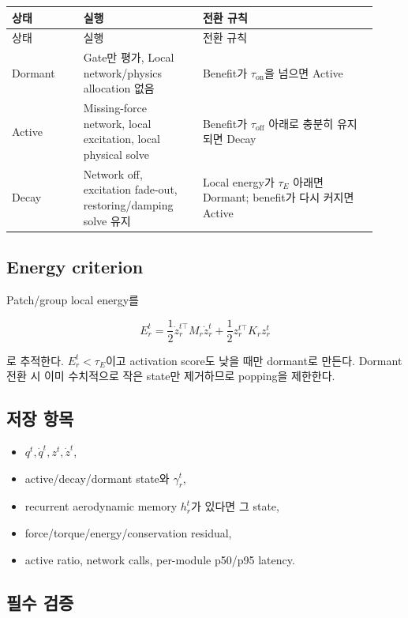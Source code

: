 \documentclass[11pt,a4paper]{article}
\begin{document}
\begin{longtable}{L{0.18\linewidth}L{0.30\linewidth}L{0.44\linewidth}}
\toprule
상태 & 실행 & 전환 규칙 \\
\midrule
\endfirsthead
\toprule
상태 & 실행 & 전환 규칙 \\
\midrule
\endhead
Dormant & Gate만 평가, Local network/physics allocation 없음 & Benefit가 \(\tau_{\mathrm{on}}\)을 넘으면 Active \\
\addlinespace
Active & Missing-force network, local excitation, local physical solve & Benefit가 \(\tau_{\mathrm{off}}\) 아래로 충분히 유지되면 Decay \\
\addlinespace
Decay & Network off, excitation fade-out, restoring/damping solve 유지 & Local energy가 \(\tau_E\) 아래면 Dormant; benefit가 다시 커지면 Active \\
\bottomrule
\end{longtable}

\subsection*{Energy criterion}

Patch/group local energy를

\begin{equation}
  E_r^t
  =
  \frac12\dot z_r^{t\top}M_r\dot z_r^t
  +
  \frac12 z_r^{t\top}K_rz_r^t
\end{equation}

로 추적한다.
\(E_r^t<\tau_E\)이고 activation score도 낮을 때만 dormant로 만든다.
Dormant 전환 시 이미 수치적으로 작은 state만 제거하므로 popping을 제한한다.

\subsection*{저장 항목}

\begin{itemize}[leftmargin=1.5em]
  \item \(q^t,\dot q^t,z^t,\dot z^t\),
  \item active/decay/dormant state와 \(\gamma_r^t\),
  \item recurrent aerodynamic memory \(h_r^t\)가 있다면 그 state,
  \item force/torque/energy/conservation residual,
  \item active ratio, network calls, per-module p50/p95 latency.
\end{itemize}

\subsection*{필수 검증}
\end{document}

